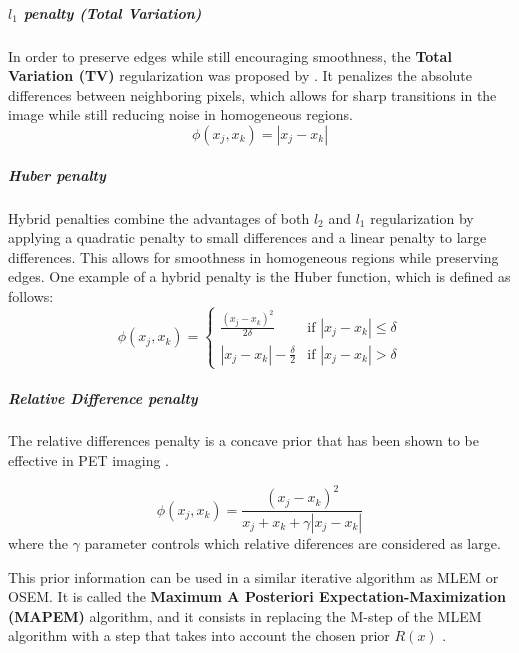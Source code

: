 \subparagraph{$l_1$ penalty (Total Variation)}

In order to preserve edges while still encouraging smoothness, the \textbf{Total Variation (TV)} regularization was proposed by \cite{Rudin1992}. It penalizes the absolute differences between neighboring pixels, which allows for sharp transitions in the image while still reducing noise in homogeneous regions.
\begin{equation}
    \phi(x_j, x_k) = |x_j - x_k|
\end{equation}

\subparagraph{Huber penalty}

Hybrid penalties combine the advantages of both $l_2$ and $l_1$ regularization by applying a quadratic penalty to small differences and a linear penalty to large differences. This allows for smoothness in homogeneous regions while preserving edges. One example of a hybrid penalty is the Huber function, which is defined as follows:
\begin{equation}
    \phi(x_j, x_k) = \begin{cases}
        \displaystyle \frac{(x_j - x_k)^2}{2 \delta}  & \text{if } |x_j - x_k| \leq \delta \\
        \displaystyle |x_j - x_k| - \frac{\delta}{2} & \text{if } |x_j - x_k| > \delta
    \end{cases}
\end{equation}

\subparagraph{Relative Difference penalty}

The relative differences penalty is a concave prior that has been shown to be effective in PET imaging \cite{Nuyts2002}.

\begin{equation}
    \phi(x_j, x_k) = \frac{(x_j - x_k)^2}{x_j + x_k + \gamma |x_j - x_k|}
\end{equation}
where the $\gamma$ parameter controls which relative diferences are considered as large.


This prior information can be used in a similar iterative algorithm as MLEM or OSEM. It is called the \textbf{Maximum A Posteriori Expectation-Maximization (MAPEM)} algorithm, and it consists in replacing the M-step of the MLEM algorithm with a step that takes into account the chosen prior $R(x)$ \cite{Green1990}.

